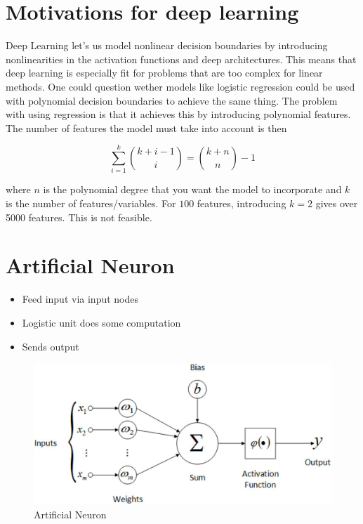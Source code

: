 \section{Motivations for deep learning}

Deep Learning let's us model nonlinear decision boundaries by introducing
nonlinearities in the activation functions and deep architectures. This means 
that deep learning is especially fit for problems that are too complex for 
linear methods. One could question wether models like logistic regression could
be used with polynomial decision boundaries to achieve the same thing. 
The problem with using regression is that it achieves this by introducing
polynomial features. The number of features the model must take into account
is then 

\begin{equation*}
    \sum_{i = 1}^k \binom{k + i - 1}{i} = \binom{k+n}{n} - 1
\end{equation*}

where $n$ is the polynomial degree that you want the model to incorporate and
$k$ is the number of features/variables. \cite{mathoverflowquestion}
For $100$ features, introducing $k = 2$ gives over 5000 features. This is not
feasible. 

\section{Artificial Neuron}
\begin{itemize}
    \item Feed input via input nodes
    \item Logistic unit does some computation
    \item Sends output
\end{itemize}

\bigskip
\begin{figure}[H]
\centering
\includegraphics[scale=0.25]{figures/artificialneuron.jpeg}
\caption{Artificial Neuron}
\end{figure}

